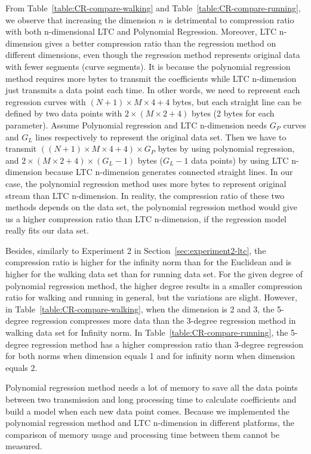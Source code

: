 From Table~\ref{table:CR-compare-walking} and
Table~\ref{table:CR-compare-running}, we observe that increasing the dimension
$n$ is detrimental to compression ratio with both n-dimensional LTC and
Polynomial Regression. Moreover, LTC n-dimension gives a better compression
ratio than the regression method on different dimensions, even though the
regression method represents original data with fewer segments (curve segments).
It is because the polynomial regression method requires more bytes to transmit
the coefficients while LTC n-dimension just transmits a data point each time. In
other words, we need to represent each regression curves with $(N+1)\times
M\times 4+4$ bytes, but each straight line can be defined by two data points
with $2\times(M\times 2+4)$ bytes (2 bytes for each parameter). Assume
Polynomial regression and LTC n-dimension needs $G_P$ curves and $G_L$ lines
respectively to represent the original data set. Then we have to transmit
$((N+1)\times M\times 4+4)\times G_P$ bytes by using polynomial regression, and
$2\times(M\times 2+4) \times (G_L-1)$ bytes ($G_L-1$ data points) by using LTC
n-dimension because LTC n-dimension generates connected straight lines. In our
case, the polynomial regression method uses more bytes to represent original
stream than LTC n-dimension. In reality, the compression ratio of these two
methods depends on the data set, the polynomial regression method would give us
a higher compression ratio than LTC n-dimension, if the regression model really
fits our data set.
 
Besides, similarly to Experiment 2 in Section~\ref{sec:experiment2-ltc}, the
compression ratio is higher for the infinity norm than for the Euclidean and is
higher for the walking data set than for running data set. For the given degree
of polynomial regression method, the higher degree results in a smaller
compression ratio for walking and running in general, but the variations are
slight. However, in Table~\ref{table:CR-compare-walking}, when the dimension is
2 and 3, the 5-degree regression compresses more data than the 3-degree
regression method in walking data set for Infinity norm. In
Table~\ref{table:CR-compare-running}, the 5-degree regression method has a
higher compression ratio than 3-degree regression for both norms when dimension
equals 1 and for infinity norm when dimension equals 2.

Polynomial regression method needs a lot of memory to save all the data points
between two transmission and long processing time to calculate coefficients and
build a model when each new data point comes. Because we implemented the
polynomial regression method and LTC n-dimension in different platforms, the
comparison of memory usage and processing time between them cannot be measured.

